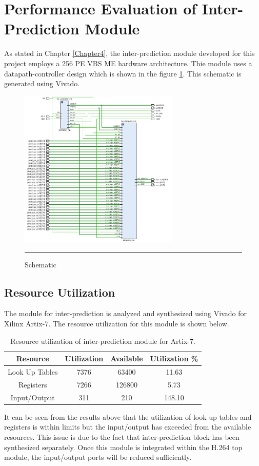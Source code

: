 \section{Performance Evaluation of Inter-Prediction Module}
As stated in Chapter \ref{Chapter4}, the inter-prediction module developed for this project employs a 256 PE VBS ME hardware architecture. Thie module uses a datapath-controller design which is shown in the figure \ref{fig:mehardware}. This schematic is generated using Vivado. 
\begin{figure}[H]
	\centering
	\includegraphics[width = 3in]{./Figures/mehardware.png}
	\rule{35em}{0.5pt}
	\caption{Schematic}
	\label{fig:mehardware}
\end{figure}
\subsection{Resource Utilization}
The module for inter-prediction is analyzed and synthesized using Vivado for Xilinx Artix-7. The resource utilization for this module is shown below.
\begin{table}[H]
	\centering
	\begin{tabular}{|c|c|c|c|} \hline
		Resource & Utilization & Available & Utilization \% \\ \hline
		Look Up Tables & 7376 & 63400 & 11.63 \\ \hline
		Registers & 7266 & 126800 & 5.73 \\ \hline
		Input/Output & 311 & 210 & 148.10 \\ \hline 
	\end{tabular}
	\caption{Resource utilization of inter-prediction module for Artix-7.}
	\label{tab:resource_me}
\end{table}

It can be seen from the results above that the utilization of look up tables and registers is within limits but the input/output has exceeded from the available resources. This issue is due to the fact that inter-prediction block has been synthesized separately. Once this module is integrated within the H.264 top module, the input/output ports will be reduced sufficiently.  

